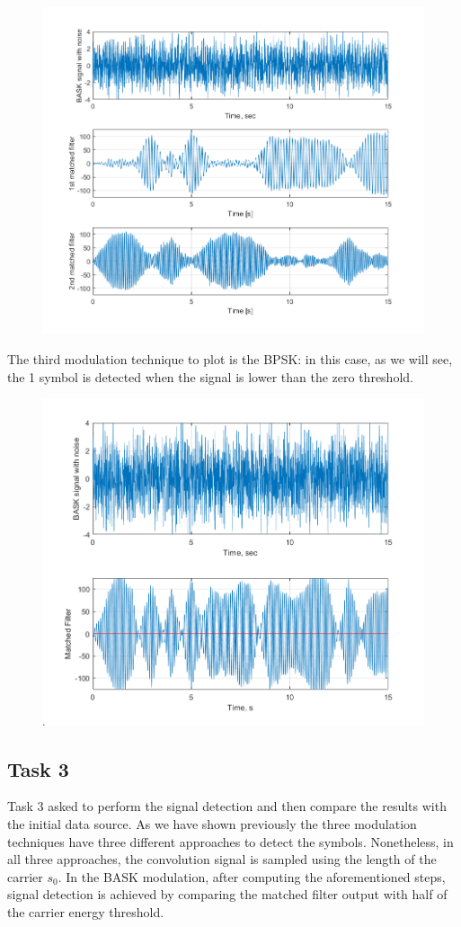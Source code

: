 \begin{figure}[h!]
    \centering
    \includegraphics[width = .7\textwidth]{lab-5/imgs/BFSK.png}
\end{figure}

\FloatBarrier\noindent The third modulation technique to plot is the BPSK: in this case, as we will see, the 1 symbol is detected when the signal is lower than the zero threshold.

\begin{figure}[h!]
    \centering
    \includegraphics[width = .7\textwidth]{lab-5/imgs/BPSK.png}
\end{figure}


\subsection*{Task 3}
Task 3 asked to perform the signal detection and then compare the results with the initial data source. As we have shown previously the three modulation techniques have three different approaches to detect the symbols. Nonetheless, in all three approaches, the convolution signal is sampled using the length of the carrier $s_0$. In the BASK modulation, after computing the aforementioned steps, signal detection is achieved by comparing the matched filter output with half of the carrier energy threshold.

